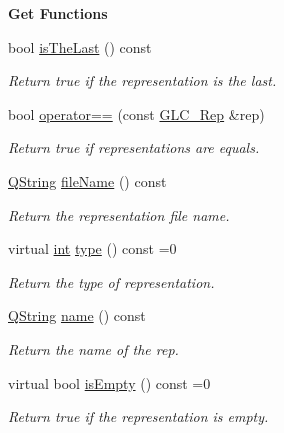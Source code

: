 \begin{Indent}{\bf Get Functions}\par
\begin{DoxyCompactItemize}
\item 
bool \hyperlink{class_g_l_c___rep_a2f4fadd7cb891e03d04eb354dd05c203}{is\-The\-Last} () const 
\begin{DoxyCompactList}\small\item\em Return true if the representation is the last. \end{DoxyCompactList}\item 
bool \hyperlink{class_g_l_c___rep_ae79b26b3c3976d8db8044db701e8586a}{operator==} (const \hyperlink{class_g_l_c___rep}{G\-L\-C\-\_\-\-Rep} \&rep)
\begin{DoxyCompactList}\small\item\em Return true if representations are equals. \end{DoxyCompactList}\item 
\hyperlink{group___u_a_v_objects_plugin_gab9d252f49c333c94a72f97ce3105a32d}{Q\-String} \hyperlink{class_g_l_c___rep_a05c611f5f34a146a3d41449fb290afeb}{file\-Name} () const 
\begin{DoxyCompactList}\small\item\em Return the representation file name. \end{DoxyCompactList}\item 
virtual \hyperlink{ioapi_8h_a787fa3cf048117ba7123753c1e74fcd6}{int} \hyperlink{class_g_l_c___rep_a2b204c7435d74f137723c7ca48227dc8}{type} () const =0
\begin{DoxyCompactList}\small\item\em Return the type of representation. \end{DoxyCompactList}\item 
\hyperlink{group___u_a_v_objects_plugin_gab9d252f49c333c94a72f97ce3105a32d}{Q\-String} \hyperlink{class_g_l_c___rep_a516d89ae010d9cac4f4be3905dfcfac0}{name} () const 
\begin{DoxyCompactList}\small\item\em Return the name of the rep. \end{DoxyCompactList}\item 
virtual bool \hyperlink{class_g_l_c___rep_a637ca9befb3ec8b44635ff7e438fc262}{is\-Empty} () const =0
\begin{DoxyCompactList}\small\item\em Return true if the representation is empty. \end{DoxyCompactList}\item 

\end{DoxyCompactItemize}
\end{Indent}

